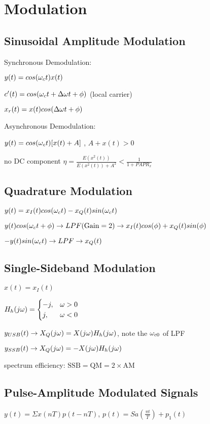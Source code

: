 \section{Modulation}

\subsection*{Sinusoidal Amplitude Modulation}
Synchronous Demodulation: 

$y(t)=cos(\omega_c t)x(t)$

$c'(t)=cos(\omega_c t + \Delta \omega t + \phi)$ (local carrier)

$x_r(t)=x(t)cos(\Delta \omega t + \phi)$

Asynchronous Demodulation: 

$ y(t)=cos(\omega_c t)[x(t)+A]  $ ,   $A+x(t)>0$ 

no DC component \to $\eta=\frac{E(x^2(t))}{E(x^2(t))+A^2}<\frac{1}{1+PAPR_x}$

\subsection*{Quadrature Modulation}
$y(t)=x_I(t)cos(\omega_c t)-x_Q(t)sin(\omega_c t)$

$y(t)cos(\omega_c t + \phi) \to LPF(\text{Gain}=2) \to x_I(t)cos(\phi)+x_Q(t)sin(\phi)$

$-y(t)sin(\omega_c t) \to LPF \to x_Q(t)$

\subsection*{Single-Sideband Modulation}
$x(t)=x_I(t)$

$H_h(j\omega)=\begin{cases} -j,& \omega >0 \\ j,& \omega<0 \end{cases}$ 

$y_{USB}(t) \to X_Q(j\omega)=X(j\omega)H_h(j\omega)$,   note the $\omega_{c0}$ of LPF

$y_{SSB}(t) \to X_Q(j\omega)=-X(j\omega)H_h(j\omega)$

spectrum efficiency: $\text{SSB}=\text{QM}=2 \times \text{AM}$

\subsection*{Pulse-Amplitude Modulated Signals}
$y(t)=\Sigma x(nT)p(t-nT)$,   $p(t)=Sa(\frac{\pi t}{T})+p_1(t)$ 


